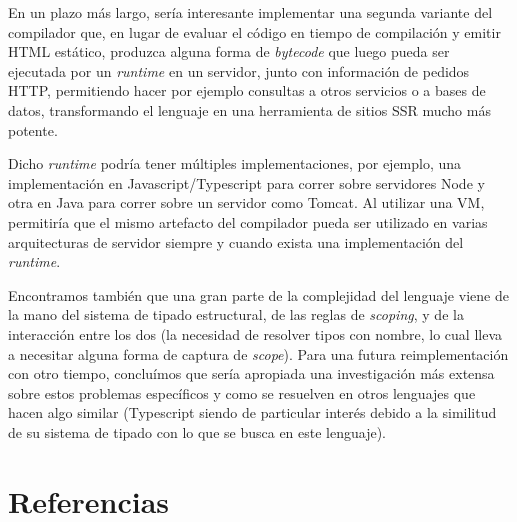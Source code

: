 En un plazo más largo, sería interesante implementar una segunda variante del compilador que, en lugar de evaluar el código en tiempo de compilación y emitir HTML estático, produzca alguna forma de \textit{bytecode} que luego pueda ser ejecutada por un \textit{runtime} en un servidor, junto con información de pedidos HTTP, permitiendo hacer por ejemplo consultas a otros servicios o a bases de datos, transformando el lenguaje en una herramienta de sitios SSR mucho más potente.

Dicho \textit{runtime} podría tener múltiples implementaciones, por ejemplo, una implementación en Javascript/Typescript para correr sobre servidores Node y otra en Java para correr sobre un servidor como Tomcat. Al utilizar una VM, permitiría que el mismo artefacto del compilador pueda ser utilizado en varias arquitecturas de servidor siempre y cuando exista una implementación del \textit{runtime}.

Encontramos también que una gran parte de la complejidad del lenguaje viene de la mano del sistema de tipado estructural, de las reglas de \textit{scoping}, y de la interacción entre los dos (la necesidad de resolver tipos con nombre, lo cual lleva a necesitar alguna forma de captura de \textit{scope}). Para una futura reimplementación con otro tiempo, concluímos que sería apropiada una investigación más extensa sobre estos problemas específicos y como se resuelven en otros lenguajes que hacen algo similar (Typescript siendo de particular interés debido a la similitud de su sistema de tipado con lo que se busca en este lenguaje).

\pagebreak
\section{Referencias}




